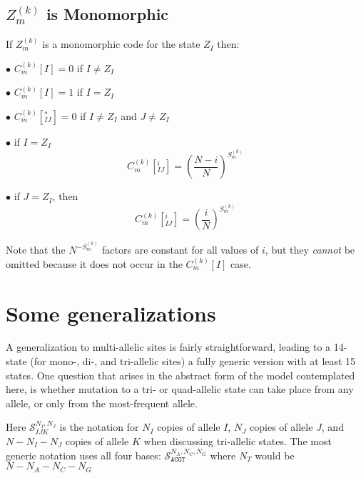 \documentclass{llncs}
\newcommand{\virtPopSize}{\ensuremath{N}}
\newcommand{\triPomoState}[5]{\ensuremath{\mathcal{S}_{#1#2#3}^{#4,#5}}}
\newcommand{\quadPomoState}[3]{\ensuremath{\mathcal{S}_{\texttt{ACGT}}^{#1,#2,#3}}}
\begin{document}
\subsection*{$Z_m^{(k)}$ is Monomorphic}
If $Z_m^{(k)}$ is a monomorphic code for the state $Z_I$ then:
\begin{compactitem}
    \item[$\bullet$] $C_m^{(k)}[I] = 0$ if $I\neq Z_I$
    \item[$\bullet$] $C_m^{(k)}[I] = 1$ if $I = Z_I$
    \item[$\bullet$] $C_m^{(k)}[^{\ast}_{IJ}] = 0$  if $I\neq Z_I$ and $J\neq Z_I$
    \item[$\bullet$] if $I = Z_I$
     $$C_m^{(k)}[^{i}_{IJ}] = \left(\frac{\virtPopSize - i}{\virtPopSize}\right)^{S_m^{(k)}}$$
    \item[$\bullet$] if $J = Z_I$, then
        $$C_m^{(k)}[^{i}_{IJ}] = \left(\frac{i}{\virtPopSize}\right)^{S_m^{(k)}}$$
\end{compactitem}
Note that the $ \virtPopSize^{-S_m^{(k)}}$ factors are constant for all values of $i$, but they 
     {\em cannot} be omitted because it does not occur in the $C_m^{(k)}[I]$ case.


\section{Some generalizations}
A generalization to multi-allelic sites is fairly straightforward, leading to a 14-state
    (for mono-, di-, and tri-allelic sites) a fully generic version with at least 15 states.
One question that arises in the abstract form of the model contemplated here, is whether mutation
    to a tri- or quad-allelic state can take place from any allele, or only from the most-frequent
    allele.

Here $\triPomoState{I}{J}{K}{N_I}{N_J}$ is the notation for $N_I$ copies of allele $I$, $N_J$ copies
    of allele $J$, and $\virtPopSize-N_I -N_J$ copies of allele $K$ when discussing tri-allelic states.
The most generic notation uses all four bases: $\quadPomoState{N_A}{N_C}{N_G}$ where $N_T$ would be $\virtPopSize-N_A - N_C - N_G$
\end{document}
